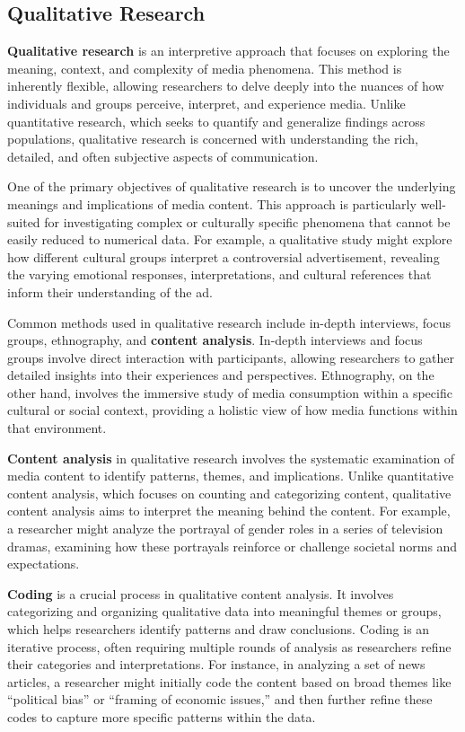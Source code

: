 \documentclass[
]{book}
\begin{document}
\subsection*{Qualitative Research}\label{qualitative-research}

\textbf{Qualitative research} is an interpretive approach that focuses on exploring the meaning, context, and complexity of media phenomena. This method is inherently flexible, allowing researchers to delve deeply into the nuances of how individuals and groups perceive, interpret, and experience media. Unlike quantitative research, which seeks to quantify and generalize findings across populations, qualitative research is concerned with understanding the rich, detailed, and often subjective aspects of communication.

One of the primary objectives of qualitative research is to uncover the underlying meanings and implications of media content. This approach is particularly well-suited for investigating complex or culturally specific phenomena that cannot be easily reduced to numerical data. For example, a qualitative study might explore how different cultural groups interpret a controversial advertisement, revealing the varying emotional responses, interpretations, and cultural references that inform their understanding of the ad.

Common methods used in qualitative research include in-depth interviews, focus groups, ethnography, and \textbf{content analysis}. In-depth interviews and focus groups involve direct interaction with participants, allowing researchers to gather detailed insights into their experiences and perspectives. Ethnography, on the other hand, involves the immersive study of media consumption within a specific cultural or social context, providing a holistic view of how media functions within that environment.

\textbf{Content analysis} in qualitative research involves the systematic examination of media content to identify patterns, themes, and implications. Unlike quantitative content analysis, which focuses on counting and categorizing content, qualitative content analysis aims to interpret the meaning behind the content. For example, a researcher might analyze the portrayal of gender roles in a series of television dramas, examining how these portrayals reinforce or challenge societal norms and expectations.

\textbf{Coding} is a crucial process in qualitative content analysis. It involves categorizing and organizing qualitative data into meaningful themes or groups, which helps researchers identify patterns and draw conclusions. Coding is an iterative process, often requiring multiple rounds of analysis as researchers refine their categories and interpretations. For instance, in analyzing a set of news articles, a researcher might initially code the content based on broad themes like ``political bias'' or ``framing of economic issues,'' and then further refine these codes to capture more specific patterns within the data.
\end{document}

